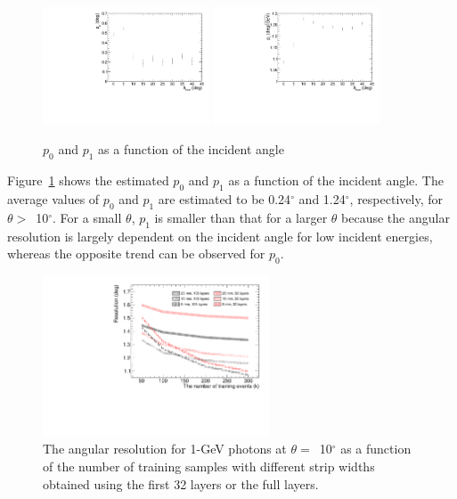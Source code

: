 \documentclass[preprint,12pt,times,a4paper]{elsarticle}
\begin{document}
\begin{figure}[!hbt]
\centering
\includegraphics[width=0.44\textwidth]{figures/Fig7_p0.pdf}
\includegraphics[width=0.44\textwidth]{figures/Fig7_p1.pdf}
\caption{ $p_{0}$ and $p_{1}$ as a function of the incident angle }
\label{fig:res_edep}
\end{figure}

Figure~\ref{fig:res_edep} shows the estimated $p_{0}$ and $p_{1}$ as a function of the incident angle. The average values of $p_{0}$ and $p_{1}$ are estimated to be 0.24$^{\circ}$ and 1.24$^{\circ}$, respectively, for $\theta>$~10$^{\circ}$. For a small $\theta$, $p_{1}$ is smaller than that for a larger $\theta$ because the angular resolution is largely dependent on the incident angle for low incident energies, whereas the opposite trend can be observed for $p_{0}$.

\begin{figure}[!hbt]
\centering
\includegraphics[width=0.6\textwidth]{figures/Fig8_nsample.pdf}
\caption{ The angular resolution for 1-GeV photons at $\theta=$~10$^{\circ}$ as a function of the number of training samples with different strip widths obtained using the first 32 layers or the full layers. }
\label{fig:multi-parameter}
\end{figure}
\end{document}
